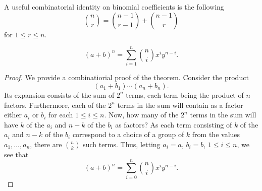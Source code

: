 A useful combinatorial identity on binomial coefficients is the following
\[
  \binom{n}{r}=\binom{n-1}{r-1}+\binom{n-1}{r}
\]
for \(1\leq r\leq n\).

\begin{theorem}
  \[
    (a+b)^n=\sum_{i=1}^n\binom{n}{i}x^iy^{n-i}.
  \]
\end{theorem}
\begin{proof}
  We provide a combinatiorial proof of the theorem. Consider the product
  \[
    (a_1+b_1)\dotsm(a_n+b_n).
  \]
  Its expansion consists of the sum of \(2^n\) terms, each term being the
  product of \(n\) factors. Furthermore, each of the \(2^n\) terms in the
  sum will contain as a factor either \(a_i\) or \(b_i\) for each
  \(1\leq i\leq n\). Now, how many of the \(2^n\) terms in the sum will
  have \(k\) of the \(a_i\) and \(n-k\) of the \(b_i\) as factors? As each
  term consisting of \(k\) of the \(a_i\) and \(n-k\) of the \(b_i\)
  correspond to a choice of a group of \(k\) from the values
  \(a_1,\dotsc,a_n\), there are \(\binom{n}{k}\) such terms. Thus, letting
  \(a_i=a\), \(b_i=b\), \(1\leq i\leq n\), we see that
  \[
    (a+b)^n=\sum_{i=0}^n\binom{n}{i}x^iy^{n-i}.
  \]
\end{proof}

